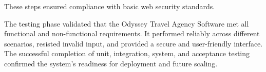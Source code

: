 These steps ensured compliance with basic web security standards.

The testing phase validated that the Odyssey Travel Agency Software met all functional and non-functional requirements. It performed reliably across different scenarios, resisted invalid input, and provided a secure and user-friendly interface. The successful completion of unit, integration, system, and acceptance testing confirmed the system's readiness for deployment and future scaling.

